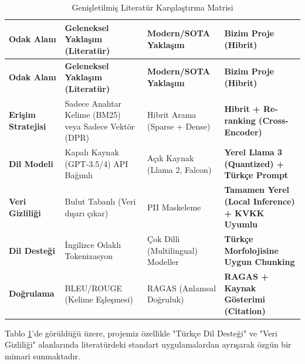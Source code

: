 \documentclass[12pt,a4paper]{report}
\begin{document}
\begin{longtable}{|p{3cm}|p{4cm}|p{4cm}|p{3.5cm}|}
\caption{Genişletilmiş Literatür Karşılaştırma Matrisi} \label{tab:lit_matrix} \\
\hline
\textbf{Odak Alanı} & \textbf{Geleneksel Yaklaşım (Literatür)} & \textbf{Modern/SOTA Yaklaşım} & \textbf{Bizim Proje (Hibrit)} \\
\hline
\endfirsthead
\hline
\textbf{Odak Alanı} & \textbf{Geleneksel Yaklaşım (Literatür)} & \textbf{Modern/SOTA Yaklaşım} & \textbf{Bizim Proje (Hibrit)} \\
\hline
\endhead

\textbf{Erişim Stratejisi} & Sadece Anahtar Kelime (BM25) veya Sadece Vektör (DPR) \cite{karpukhin2020dense} & Hibrit Arama (Sparse + Dense) & \textbf{Hibrit + Re-ranking (Cross-Encoder) \cite{nogueira2019passage}} \\
\hline
\textbf{Dil Modeli} & Kapalı Kaynak (GPT-3.5/4) API Bağımlı \cite{brown2020language} & Açık Kaynak (Llama 2, Falcon) & \textbf{Yerel Llama 3 (Quantized) + Türkçe Prompt} \\
\hline
\textbf{Veri Gizliliği} & Bulut Tabanlı (Veri dışarı çıkar) & PII Maskeleme & \textbf{Tamamen Yerel (Local Inference) + KVKK Uyumlu \cite{touvron2023llama}} \\
\hline
\textbf{Dil Desteği} & İngilizce Odaklı Tokenizasyon & Çok Dilli (Multilingual) Modeller & \textbf{Türkçe Morfolojisine Uygun Chunking \cite{coltekin2022turkish}} \\
\hline
\textbf{Doğrulama} & BLEU/ROUGE (Kelime Eşleşmesi) \cite{lin2004rouge} & RAGAS (Anlamsal Doğruluk) & \textbf{RAGAS + Kaynak Gösterimi (Citation)} \\
\hline
\end{longtable}

Tablo \ref{tab:lit_matrix}'de görüldüğü üzere, projemiz özellikle "Türkçe Dil Desteği" ve "Veri Gizliliği" alanlarında literatürdeki standart uygulamalardan ayrışarak özgün bir mimari sunmaktadır.
\end{document}
